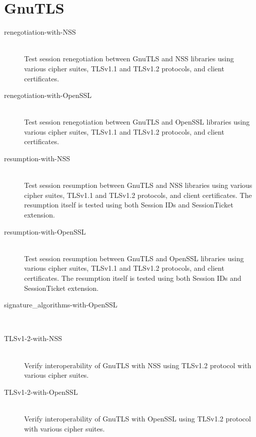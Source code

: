 \section{GnuTLS}
    \begin{description}
        \item[renegotiation-with-NSS] \hfill \\
            Test session renegotiation between GnuTLS and NSS libraries using
            various cipher suites, TLSv1.1 and TLSv1.2 protocols, and
            client certificates.
        \item[renegotiation-with-OpenSSL] \hfill \\
            Test session renegotiation between GnuTLS and OpenSSL libraries using
            various cipher suites, TLSv1.1 and TLSv1.2 protocols, and
            client certificates.
        \item[resumption-with-NSS] \hfill \\
            Test session resumption between GnuTLS and NSS libraries using
            various cipher suites, TLSv1.1 and TLSv1.2 protocols, and
            client certificates. The resumption itself is tested using both
            Session IDs and SessionTicket extension.
        \item[resumption-with-OpenSSL] \hfill \\
            Test session resumption between GnuTLS and OpenSSL libraries using
            various cipher suites, TLSv1.1 and TLSv1.2 protocols, and
            client certificates. The resumption itself is tested using both
            Session IDs and SessionTicket extension.
        \item[signature\_algorithms-with-OpenSSL] \hfill \\
        \item[TLSv1-2-with-NSS] \hfill \\
            Verify interoperability of GnuTLS with NSS using TLSv1.2 protocol
            with various cipher suites.
        \item[TLSv1-2-with-OpenSSL] \hfill \\
            Verify interoperability of GnuTLS with OpenSSL using TLSv1.2 protocol
            with various cipher suites.
    \end{description}
